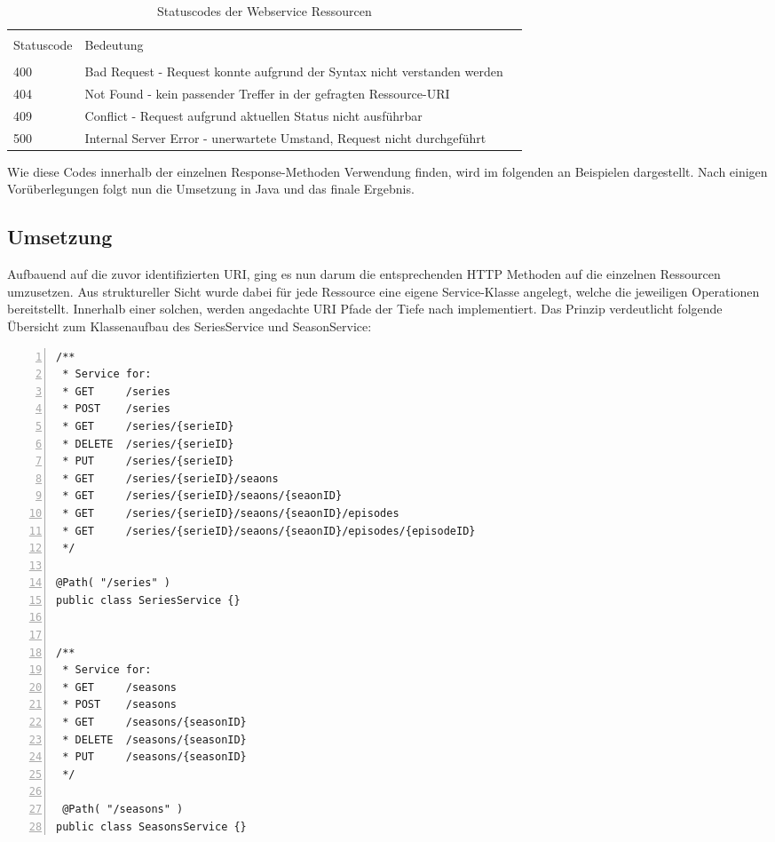 \begin{table}[H]
\caption{Statuscodes der Webservice Ressourcen}

\centering
\begin{tabular}{l l l}
\\ [-0.5ex]

\hline\hline
\\ [-0.5ex]
Statuscode & Bedeutung
\\ [1.5ex]
\hline
\\ [-0.5ex]
400 & Bad Request - Request konnte aufgrund der Syntax nicht verstanden werden\\[1ex]
404 & Not Found - kein passender Treffer in der gefragten Ressource-URI \\[1ex]
409 & Conflict - Request aufgrund aktuellen Status nicht ausführbar\\[1ex]
500 & Internal Server Error - unerwartete Umstand, Request nicht durchgeführt\\[1ex]

\hline
\end{tabular}
\label{tab:statuscodes}
\end{table}

Wie diese Codes innerhalb der einzelnen Response-Methoden Verwendung finden, wird im folgenden an Beispielen dargestellt. Nach einigen Vorüberlegungen folgt nun die Umsetzung in Java und das finale Ergebnis.

\subsection{Umsetzung}

Aufbauend auf die zuvor identifizierten URI, ging es nun darum die entsprechenden HTTP Methoden auf die einzelnen Ressourcen umzusetzen. Aus struktureller Sicht wurde dabei für jede Ressource eine eigene Service-Klasse angelegt, welche die jeweiligen Operationen bereitstellt. Innerhalb einer solchen, werden angedachte URI Pfade der Tiefe nach implementiert. Das Prinzip verdeutlicht folgende Übersicht zum Klassenaufbau des SeriesService und SeasonService:

\begin{lstlisting}[basicstyle=\ttfamily,numbers=left,numberstyle=\footnotesize\ttfamily,backgroundcolor=\color{source},label=seriesseasonsservices,caption= Klassenaufbau von BeispielServices]
/**
 * Service for:
 * GET     /series
 * POST    /series
 * GET     /series/{serieID}
 * DELETE  /series/{serieID}
 * PUT     /series/{serieID}
 * GET     /series/{serieID}/seaons
 * GET     /series/{serieID}/seaons/{seaonID}
 * GET     /series/{serieID}/seaons/{seaonID}/episodes
 * GET     /series/{serieID}/seaons/{seaonID}/episodes/{episodeID}
 */

@Path( "/series" )
public class SeriesService {}


/**
 * Service for:
 * GET     /seasons
 * POST    /seasons
 * GET     /seasons/{seasonID}
 * DELETE  /seasons/{seasonID}
 * PUT     /seasons/{seasonID}
 */

 @Path( "/seasons" )
public class SeasonsService {}

\end{lstlisting}

